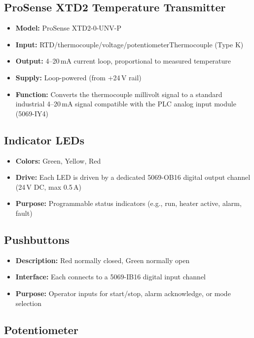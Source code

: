 \documentclass[main.tex]{subfiles}
\begin{document}
\subsection{ProSense XTD2 Temperature Transmitter}

\begin{itemize}
    \item \textbf{Model:} ProSense XTD2-0-UNV-P
    \item \textbf{Input:} RTD/thermocouple/voltage/potentiometerThermocouple (Type K)
    \item \textbf{Output:} 4--20\,mA current loop, proportional to measured temperature
    \item \textbf{Supply:} Loop-powered (from +24\,V rail)
    \item \textbf{Function:} Converts the thermocouple millivolt signal to a standard industrial 4--20\,mA signal compatible with the PLC analog input module (5069-IY4)
\end{itemize}

\subsection{Indicator LEDs}

\begin{itemize}
    \item \textbf{Colors:} Green, Yellow, Red
    \item \textbf{Drive:} Each LED is driven by a dedicated 5069-OB16 digital output channel (24\,V DC, max 0.5\,A)
    \item \textbf{Purpose:} Programmable status indicators (e.g., run, heater active, alarm, fault)
\end{itemize}

\subsection{Pushbuttons}

\begin{itemize}
    \item \textbf{Description:} Red normally closed, Green normally open
    \item \textbf{Interface:} Each connects to a 5069-IB16 digital input channel
    \item \textbf{Purpose:} Operator inputs for start/stop, alarm acknowledge, or mode selection
\end{itemize}

\subsection{Potentiometer}
\end{document}
